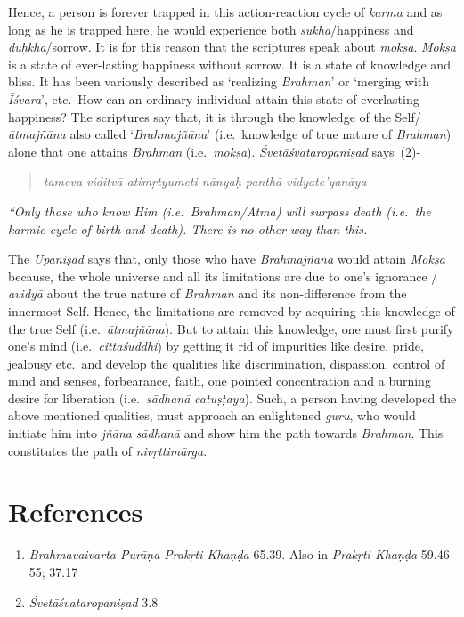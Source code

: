 Hence, a person is forever trapped in this action-reaction cycle of \emph{karma} and as long as he is trapped here, he would experience both \emph{sukha}/happiness and \emph{duḥkha}/sorrow. It is for this reason that the scriptures speak about \emph{mokṣa}. \emph{Mokṣa} is a state of ever-lasting happiness without sorrow. It is a state of knowledge and bliss. It has been variously described as `realizing \emph{Brahman}' or `merging with \emph{Īśvara}', etc.\ How can an ordinary individual attain this state of everlasting happiness? The scriptures say that, it is through the knowledge of the Self/\emph{ātmajñāna} also called `\emph{Brahmajñāna}' (i.e.\ knowledge of true nature of \emph{Brahman}) alone that one attains \emph{Brahman} (i.e.\ \emph{mokṣa}). \emph{Śvetāśvataropaniṣad} says~(2)-

\begin{verse}\emph{tameva viditvā atimṛtyumeti nānyaḥ panthā vidyate'yanāya~}\end{verse}

\emph{``Only those who know Him (i.e.\ Brahman/Ātma) will surpass death (i.e.\ the karmic cycle of birth and death). There is no other way than this.}
\vskip 2pt

The \emph{Upaniṣad} says that, only those who have \emph{Brahmajñāna} would attain \emph{Mokṣa} because, the whole universe and all its limitations are due to one's ignorance / \emph{avidyā} about the true nature of \emph{Brahman} and its non-difference from the innermost Self. Hence, the limitations are removed by acquiring this knowledge of the true Self (i.e.\ \emph{ātmajñāna}). But to attain this knowledge, one must first purify one's mind (i.e.\ \emph{cittaśuddhi}) by getting it rid of impurities like desire, pride, jealousy etc.\ and develop the qualities like discrimination, dispassion, control of mind and senses, forbearance, faith, one pointed concentration and a burning desire for liberation (i.e.\ \emph{sādhanā} \emph{catuṣṭaya}). Such, a person having developed the above mentioned qualities, must approach an enlightened \emph{guru}, who would initiate him into \emph{jñāna} \emph{sādhanā} and show him the path towards \emph{Brahman}. This constitutes the path of \emph{nivṛttimārga}.

\section*{References}

\begin{enumerate}
\itemsep=0pt
\item
  \emph{Brahmavaivarta Purāṇa Prakṛti Khaṇḍa} 65.39. Also in \emph{Prakṛti Khaṇḍa} 59.46-55; 37.17
\item
  \emph{Śvetāśvataropaniṣad} 3.8
\end{enumerate}
\newpage

